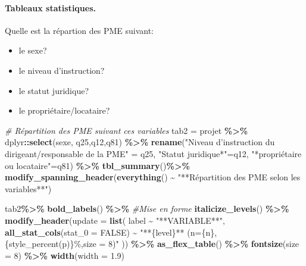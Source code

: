 \documentclass[
]{article}
\newenvironment{Shaded}{\begin{snugshade}}{\end{snugshade}}
\newcommand{\AttributeTok}[1]{\textcolor[rgb]{0.13,0.29,0.53}{#1}}
\newcommand{\CommentTok}[1]{\textcolor[rgb]{0.56,0.35,0.01}{\textit{#1}}}
\newcommand{\ConstantTok}[1]{\textcolor[rgb]{0.56,0.35,0.01}{#1}}
\newcommand{\DecValTok}[1]{\textcolor[rgb]{0.00,0.00,0.81}{#1}}
\newcommand{\FloatTok}[1]{\textcolor[rgb]{0.00,0.00,0.81}{#1}}
\newcommand{\FunctionTok}[1]{\textcolor[rgb]{0.13,0.29,0.53}{\textbf{#1}}}
\newcommand{\NormalTok}[1]{#1}
\newcommand{\OtherTok}[1]{\textcolor[rgb]{0.56,0.35,0.01}{#1}}
\newcommand{\SpecialCharTok}[1]{\textcolor[rgb]{0.81,0.36,0.00}{\textbf{#1}}}
\newcommand{\StringTok}[1]{\textcolor[rgb]{0.31,0.60,0.02}{#1}}
\begin{document}
\hfill\break

\hypertarget{tableaux-statistiques.}{%
\paragraph{Tableaux statistiques.}\label{tableaux-statistiques.}}

\hfill\break

Quelle est la répartion des PME suivant:

\begin{itemize}
\item
  le sexe?
\item
  le niveau d'instruction?
\item
  le statut juridique?
\item
  le propriétaire/locataire?\\
\end{itemize}

\begin{Shaded}
\begin{Highlighting}[]
\CommentTok{\# Répartition des PME suivant ces variables }
\NormalTok{tab2 }\OtherTok{=}\NormalTok{  projet }\SpecialCharTok{\%\textgreater{}\%}                   
\NormalTok{           dplyr}\SpecialCharTok{::}\FunctionTok{select}\NormalTok{(sexe, q25,q12,q81) }\SpecialCharTok{\%\textgreater{}\%}                       
                \FunctionTok{rename}\NormalTok{(}\StringTok{"Niveau d’instruction du dirigeant/responsable de la PME"} \OtherTok{=}\NormalTok{ q25, }\StringTok{"Statut juridique*"}\OtherTok{=}\NormalTok{q12, }\StringTok{"*propriétaire ou locataire"}\OtherTok{=}\NormalTok{q81) }\SpecialCharTok{\%\textgreater{}\%}                                
                    \FunctionTok{tbl\_summary}\NormalTok{()}\SpecialCharTok{\%\textgreater{}\%}   
                      \FunctionTok{modify\_spanning\_header}\NormalTok{(}\FunctionTok{everything}\NormalTok{() }\SpecialCharTok{\textasciitilde{}} \StringTok{"**Répartition des PME selon les variables**"}\NormalTok{) }

\NormalTok{tab2}\SpecialCharTok{\%\textgreater{}\%} \FunctionTok{bold\_labels}\NormalTok{() }\SpecialCharTok{\%\textgreater{}\%} \CommentTok{\#Mise en forme}
              \FunctionTok{italicize\_levels}\NormalTok{()  }\SpecialCharTok{\%\textgreater{}\%}    
                    \FunctionTok{modify\_header}\NormalTok{(}\AttributeTok{update =} \FunctionTok{list}\NormalTok{( label }\SpecialCharTok{\textasciitilde{}} \StringTok{"**VARIABLE**"}\NormalTok{, }\FunctionTok{all\_stat\_cols}\NormalTok{(}\AttributeTok{stat\_0 =} \ConstantTok{FALSE}\NormalTok{) }\SpecialCharTok{\textasciitilde{}} \StringTok{"**\{level\}** (n=\{n\}, \{style\_percent(p)\}\%,size = 8)"}\NormalTok{   )) }\SpecialCharTok{\%\textgreater{}\%}
                          \FunctionTok{as\_flex\_table}\NormalTok{() }\SpecialCharTok{\%\textgreater{}\%}   
                             \FunctionTok{fontsize}\NormalTok{(}\AttributeTok{size =} \DecValTok{8}\NormalTok{) }\SpecialCharTok{\%\textgreater{}\%}   
                                \FunctionTok{width}\NormalTok{(}\AttributeTok{width =} \FloatTok{1.9}\NormalTok{)   }
\end{Highlighting}
\end{Shaded}
\end{document}
